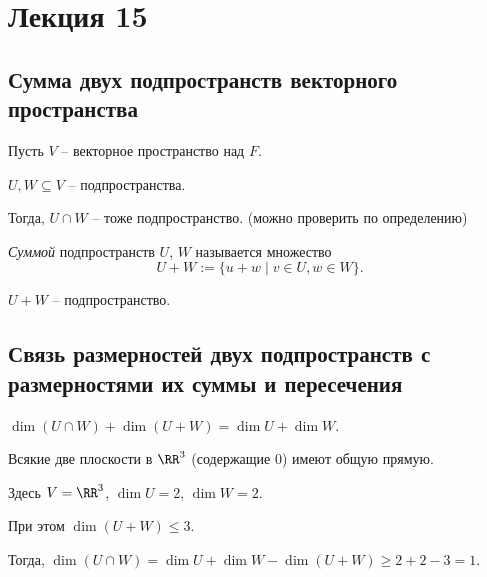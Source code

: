 \section{Лекция 15}

\subsection{Сумма двух подпространств векторного пространства}

Пусть $V$ -- векторное пространство над $F$.

$U, W \subseteq V$ -- подпространства.

Тогда, $U \cap W$ -- тоже подпространство. (можно проверить по определению)

\begin{definition}
    \textit{Суммой} подпространств $U$, $W$ называется множество
    \begin{equation*}
        U + W := \{u + w \mid v \in U, w \in W\}
    .\end{equation*}
\end{definition}

\begin{exercise}
    $U + W$ -- подпространство.
\end{exercise}

\begin{comment}
    Имеем $U \cap W \subseteq U = U + 0 \subseteq U + W$. 

    Значит,  $\dim (U \cap W) \leq \dim U \leq \dim (U + W)$.
\end{comment}


\subsection{Связь размерностей двух подпространств с размерностями их суммы и пересечения}

\begin{theorem}
    $\dim (U \cap W) + \dim (U + W) = \dim U + \dim W$.
\end{theorem}

\begin{example}
    Всякие две плоскости в $\RR^3$ (содержащие 0) имеют общую прямую.

    Здесь $V = \RR^3$, $\dim U = 2$, $\dim W = 2$.

    При этом $\dim (U + W) \leq 3$.

    Тогда, $\dim (U \cap W) = \dim U + \dim W - \dim (U + W) \geq 2 + 2 - 3 = 1$.
\end{example}

